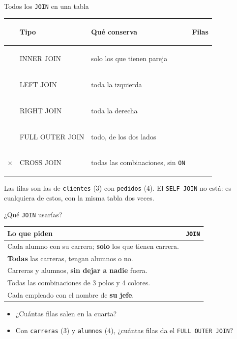 \documentclass[aspectratio=169,10pt,c]{beamer}
\newcommand{\bl}[1][1.9cm]{\underline{\hspace{#1}}}
\newcommand{\tbl}[1]{\textcolor{utpNaranja}{\texttt{#1}}}
\newcommand{\ins}[1]{\tikz[baseline=-0.5ex]{\node[rounded corners=2pt,fill=utpRojo,text=white,
  font=\bfseries\scriptsize,inner xsep=5pt,inner ysep=2.5pt] {#1};}}
\newcommand{\von}{utpRojo!45}
\newcommand{\voff}{white}
\newcommand{\venn}[4][1]{%
  \begin{tikzpicture}[scale=#1,baseline=-0.6ex]
    \fill[#2] (0,0) circle (0.62);
    \fill[#4] (0.74,0) circle (0.62);
    \begin{scope}
      \clip (0,0) circle (0.62);
      \fill[#3] (0.74,0) circle (0.62);
    \end{scope}
    \draw[thick,utpNegro] (0,0) circle (0.62);
    \draw[thick,utpNegro] (0.74,0) circle (0.62);
  \end{tikzpicture}}
\begin{document}
\begin{frame}{Todos los \texttt{JOIN} en una tabla}
\begin{center}
\renewcommand{\arraystretch}{1.75}
\small
\begin{tabular}{>{\centering\arraybackslash}m{1.7cm}>{\ttfamily\bfseries\raggedright\arraybackslash}m{3.0cm}>{\raggedright\arraybackslash}m{6.1cm}>{\centering\arraybackslash}m{1.5cm}}
\toprule
& \normalfont\bfseries Tipo & \bfseries Qué conserva & \bfseries Filas \\
\midrule
\venn[0.42]{\voff}{\von}{\voff} & INNER JOIN & solo los que tienen pareja & 3 \\
\venn[0.42]{\von}{\von}{\voff} & LEFT JOIN & toda la izquierda & 4 \\
\venn[0.42]{\voff}{\von}{\von} & RIGHT JOIN & toda la derecha & 4 \\
\venn[0.42]{\von}{\von}{\von} & FULL OUTER JOIN & todo, de los dos lados & 5 \\
$\times$ & CROSS JOIN & todas las combinaciones, sin \texttt{ON} & 12 \\
\bottomrule
\end{tabular}
\end{center}
\vspace{0.1cm}
\small Las filas son las de \tbl{clientes} (3) con \tbl{pedidos} (4). El \texttt{SELF JOIN} no está: es cualquiera de estos, con la misma tabla dos veces.
\end{frame}
\begin{frame}{\ins{Práctica 3} ¿Qué \texttt{JOIN} usarías?}
\begin{center}
\small
\renewcommand{\arraystretch}{1.15}
\begin{tabular}{>{\raggedright\arraybackslash}p{9.6cm}>{\raggedright\arraybackslash}p{2.8cm}}
\toprule
\bfseries Lo que piden & \bfseries \texttt{JOIN} \\
\midrule
Cada alumno con su carrera; \textbf{solo} los que tienen carrera. & \bl[2.6cm] \\[8pt]
\textbf{Todas} las carreras, tengan alumnos o no. & \bl[2.6cm] \\[8pt]
Carreras y alumnos, \textbf{sin dejar a nadie} fuera. & \bl[2.6cm] \\[8pt]
Todas las combinaciones de 3 polos y 4 colores. & \bl[2.6cm] \\[8pt]
Cada empleado con el nombre de \textbf{su jefe}. & \bl[2.6cm] \\
\bottomrule
\end{tabular}
\end{center}
\vspace{0.3cm}
\begin{itemize}\setlength\itemsep{5pt}
  \item ¿Cuántas filas salen en la cuarta? \bl[1.5cm]
  \item Con \tbl{carreras} (3) y \tbl{alumnos} (4), ¿cuántas filas da el \texttt{FULL OUTER JOIN}? \bl[1.5cm]
\end{itemize}
\end{frame}
\end{document}
